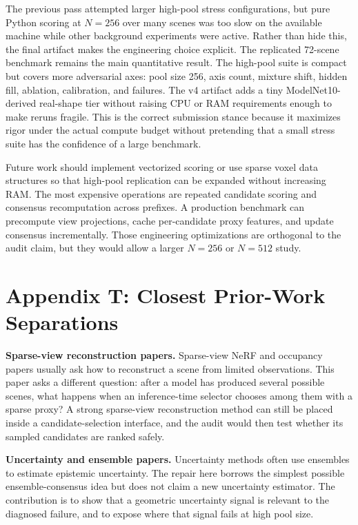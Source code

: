\documentclass{article}
\begin{document}
The previous pass attempted larger high-pool stress configurations, but pure Python
scoring at $N=256$ over many scenes was too slow on the available machine while
other background experiments were active. Rather than hide this, the final
artifact makes the engineering choice explicit. The replicated 72-scene
benchmark remains the main quantitative result. The high-pool suite is compact
but covers more adversarial axes: pool size 256, axis count, mixture shift,
hidden fill, ablation, calibration, and failures. The v4 artifact adds a tiny
ModelNet10-derived real-shape tier without raising CPU or RAM requirements
enough to make reruns fragile. This is the correct
submission stance because it maximizes rigor under the actual compute budget
without pretending that a small stress suite has the confidence of a large
benchmark.

Future work should implement vectorized scoring or use sparse voxel data
structures so that high-pool replication can be expanded without increasing
RAM. The most expensive operations are repeated candidate scoring and
consensus recomputation across prefixes. A production benchmark can precompute
view projections, cache per-candidate proxy features, and update consensus
incrementally. Those engineering optimizations are orthogonal to the audit
claim, but they would allow a larger $N=256$ or $N=512$ study.

\section{Appendix T: Closest Prior-Work Separations}

\textbf{Sparse-view reconstruction papers.}
Sparse-view NeRF and occupancy papers usually ask how to reconstruct a scene
from limited observations. This paper asks a different question: after a model
has produced several possible scenes, what happens when an inference-time
selector chooses among them with a sparse proxy? A strong sparse-view
reconstruction method can still be placed inside a candidate-selection
interface, and the audit would then test whether its sampled candidates are
ranked safely.

\textbf{Uncertainty and ensemble papers.}
Uncertainty methods often use ensembles to estimate epistemic uncertainty. The
repair here borrows the simplest possible ensemble-consensus idea but does not
claim a new uncertainty estimator. The contribution is to show that a geometric
uncertainty signal is relevant to the diagnosed failure, and to expose where
that signal fails at high pool size.
\end{document}
